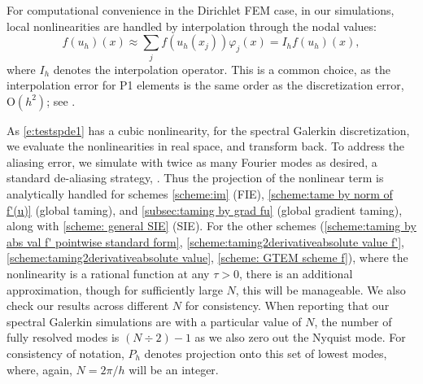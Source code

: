 \documentclass[reqno, 11pt]{amsart}
\newcommand{\gsnote}[1]{\textcolor{Cerulean}{#1}}
\theoremstyle{plain}
\theoremstyle{definition}
\theoremstyle{remark}
\numberwithin{equation}{section}
\numberwithin{theorem}{section}
\begin{document}
{%
% 





{For computational convenience in the Dirichlet FEM case, in our simulations, local nonlinearities are handled by interpolation through the nodal values:
\begin{equation}
\label{e:interp}
f(u_h)(x)\approx \sum_j f(u_h(x_j)) \varphi_j(x) = I_hf(u_h)(x),
\end{equation}
where $I_h$ denotes the interpolation operator.  This is a common choice, as the interpolation error for P1 elements is the same order as the discretization error, $\mathrm{O}(h^2)$; see \cite{Brenner,thomee2007galerkin,larsson_partial_2009}.
}



As \eqref{e:testspde1} has a cubic nonlinearity, for the spectral Galerkin discretization, we evaluate the nonlinearities in real space, and transform back.  To address the aliasing error, we  simulate with twice as many Fourier modes as desired, a standard de-aliasing strategy, \cite{canuto_spectral_2006,boyd_chebyshev_2001}.  Thus the projection of the nonlinear term is analytically handled for schemes \eqref{scheme:im} (FIE), \eqref{scheme:tame by norm of f'(u)} (global taming), and \eqref{subsec:taming by grad fu} (global gradient taming), along with  
 \eqref{scheme: general SIE}  (SIE). For the other schemes (\eqref{scheme:taming by abs val f' pointwise standard form}, \eqref{scheme:taming2derivativeabsolute value f'}, \eqref{scheme:taming2derivativeabsolute value}, \eqref{scheme: GTEM scheme f}), where the nonlinearity is a rational function at any $\tau>0$, there is an additional approximation, though for sufficiently large $N$, this will be manageable.  We also check our results across different $N$ for consistency.  When reporting that our spectral Galerkin simulations are with a particular value of $N$, the number of fully resolved modes is $(N \div 2)-1$ as we also zero out the Nyquist mode.  For consistency of notation, $P_h$ denotes projection onto this set of lowest modes, where, again, $N = 2\pi/h$ will be an integer.  
 
}
\end{document}
